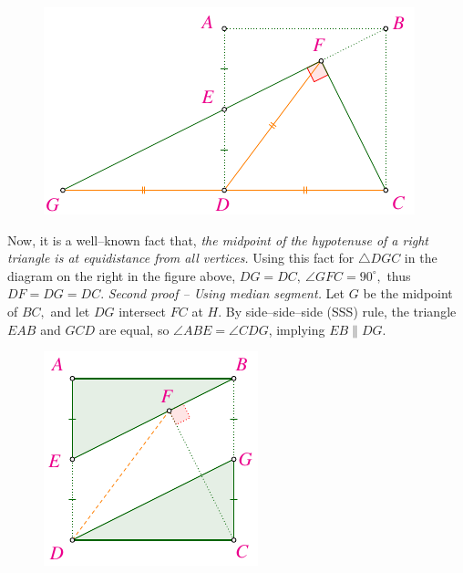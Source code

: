 \begin{multicols}{2}
\begin{figure}[H]
		\vspace*{-15pt}
	\end{figure}
	\begin{figure}[H]
		\vspace*{-5pt}
		\centering
		\captionsetup{labelformat= empty, justification=centering}
		\includegraphics[width= 0.9\linewidth]{2022-2-ms-1-1-b.pdf}
		\vspace*{-10pt}
	\end{figure}	
	Now, it is a well--known fact that,
	\textit{the midpoint of the hypotenuse of a right triangle is at equidistance from all vertices.}
	Using this fact for $\triangle DGC$ in the diagram on the right in the figure above, $DG=DC,\ \angle{GFC} = 90^\circ,$ thus $DF=DG=DC.$
	\vskip 0.1cm
	\textit{Second proof -- Using median segment.}
	Let $G$ be the midpoint of $BC,$ and let $DG$ intersect $FC$ at $H.$
	By side--side--side (SSS) rule, the triangle $ EAB$ and $  GCD$ are equal,
	so $\angle ABE = \angle CDG$, implying $EB \parallel DG.$
	\begin{figure}[H]
		\vspace*{-15pt}
		\centering
		\captionsetup{labelformat= empty, justification=centering}
		\includegraphics[width= 0.65\linewidth]{2022-2-ms-1-1-c.pdf}

\end{figure}
\end{multicols}
